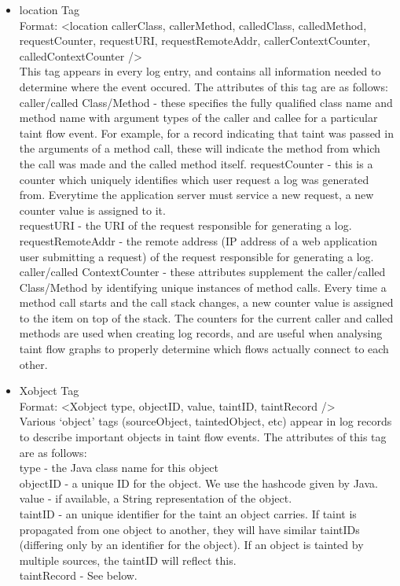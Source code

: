 \documentclass[msc,oneside]{ubcthesis}
\begin{document}
\begin{itemize}
\item location Tag \\ 
Format: <location callerClass, callerMethod, calledClass, calledMethod, requestCounter, requestURI, requestRemoteAddr, callerContextCounter, calledContextCounter /> \\
This tag appears in every log entry, and contains all information needed to determine where the event occured. The attributes of this tag are as follows: \\ 
caller/called Class/Method - these specifies the fully qualified class name and method name with argument types of the caller and callee for a particular taint flow event. For example, for a record indicating that taint was passed in the arguments of a method call, these will indicate the method from which the call was made and the called method itself.
requestCounter - this is a counter which uniquely identifies which user request a log was generated from. Everytime the application server must service a new request, a new counter value is assigned to it. \\
requestURI - the URI of the request responsible for generating a log. \\
requestRemoteAddr - the remote address (IP address of a web application user submitting a request) of the request responsible for generating a log. \\
caller/called ContextCounter - these attributes supplement the caller/called Class/Method by identifying unique instances of method calls. Every time a method call starts and the call stack changes, a new counter value is assigned to the item on top of the stack. The counters for the current caller and called methods are used when creating log records, and are useful when analysing taint flow graphs to properly determine which flows actually connect to each other.

\item Xobject Tag \\ 
Format: <Xobject type, objectID, value, taintID, taintRecord /> \\
Various `object' tags (sourceObject, taintedObject, etc) appear in log records to describe important objects in taint flow events. The attributes of this tag are as follows: \\
type - the Java class name for this object \\
objectID - a unique ID for the object. We use the hashcode given by Java. \\
value - if available, a String representation of the object. \\
taintID - an unique identifier for the taint an object carries. If taint is propagated from one object to another, they will have similar taintIDs (differing only by an identifier for the object). If an object is tainted by multiple sources, the taintID will reflect this.\\
taintRecord - See below.


\end{itemize}
\end{document}

